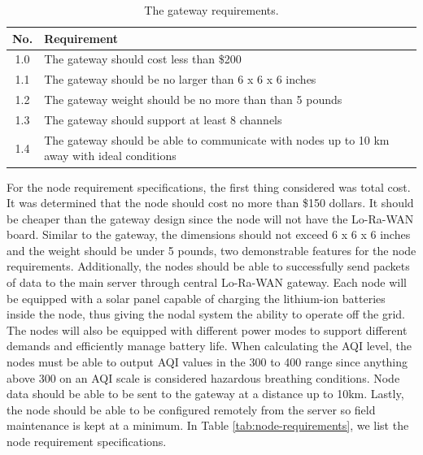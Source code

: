 \begin{table}[H]
\centering
\caption{The gateway requirements.}
\begin{tabularx}{\linewidth}{|c|X|}
\hline
No. & Requirement \\
\hline\hline
1.0 & The gateway should cost less than \$200 \\\hline
1.1 & The gateway should be no larger than 6 x 6 x 6 inches \\\hline
1.2 & The gateway weight should be no more than than 5 pounds \\\hline
1.3 & The gateway should support at least 8 channels \\\hline
1.4 & The gateway should be able to communicate with nodes up to 10 km away with ideal conditions \\\hline
\end{tabularx}
\label{tab:gateway-requirements}
\end{table}

For the node requirement specifications, the first thing considered was total cost. It was determined that the node should cost no more than \$150 dollars. It should be cheaper than the gateway design since the node will not have the Lo-Ra-WAN board. Similar to the gateway, the dimensions should not exceed 6 x 6 x 6 inches and the weight should be under 5 pounds, two demonstrable features for the node requirements. Additionally, the nodes should be able to successfully send packets of data to the main server through central Lo-Ra-WAN gateway. Each node will be equipped with a solar panel capable of charging the lithium-ion batteries inside the node, thus giving the nodal system the ability to operate off the grid. The nodes will also be equipped with different power modes to support different demands and efficiently manage battery life. When calculating the AQI level, the nodes must be able to output AQI values in the 300 to 400 range since anything above 300 on an AQI scale is considered hazardous breathing conditions. Node data should be able to be sent to the gateway at a distance up to 10km. Lastly, the node should be able to be configured remotely from the server so field maintenance is kept at a minimum. In Table \ref{tab:node-requirements}, we list the node requirement specifications.  

